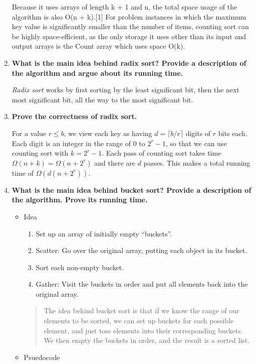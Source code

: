 \documentclass[a4paper,11pt]{article}
\begin{document}
\begin{enumerate}
  Because it uses arrays of length k + 1 and n, the total space usage of
  the algorithm is also O(n + k).{[}1{]} For problem instances in which
  the maximum key value is significantly smaller than the number of
  items, counting sort can be highly space-efficient, as the only
  storage it uses other than its input and output arrays is the Count
  array which uses space O(k).
\item
  \textbf{What is the main idea behind radix sort? Provide a description
  of the algorithm and argue about its running time.}

  \emph{Radix sort} works by first sorting by the least significant bit,
  then the next most significant bit, all the way to the most
  significant bit.
\item
  \textbf{Prove the correctness of radix sort.}

  For a value $r \le b$, we view each key as having
  $d = \lceil b / r \rceil$ digits of $r$ bits each. Each digit is an
  integer in the range of 0 to $2^r - 1$, so that we can use counting
  sort with $k = 2^r - 1$. Each pass of counting sort takes time
  $\Omega(n + k) = \Omega(n + 2^r)$ and there are $d$ passes. This makes
  a total running time of $\Omega(d(n + 2^r))$.
\item
  \textbf{What is the main idea behind bucket sort? Provide a
  description of the algorithm. Prove its running time.}

  \begin{itemize}
  \item
    Idea

    \begin{enumerate}
    \def\labelenumii{\arabic{enumii}.}
    \itemsep1pt\parskip0pt
    \item
      Set up an array of initially empty ``buckets''.
    \item
      Scatter: Go over the original array, putting each object in its
      bucket.
    \item
      Sort each non-empty bucket.
    \item
      Gather: Visit the buckets in order and put all elements back into
      the original array.
    \end{enumerate}

    \begin{quote}
    The idea behind bucket sort is that if we know the range of our
    elements to be sorted, we can set up buckets for each possible
    element, and just toss elements into their corresponding buckets. We
    then empty the buckets in order, and the result is a sorted list.
    \end{quote}
  \item
    Psuedocode


\end{itemize}
\end{enumerate}
\end{document}
